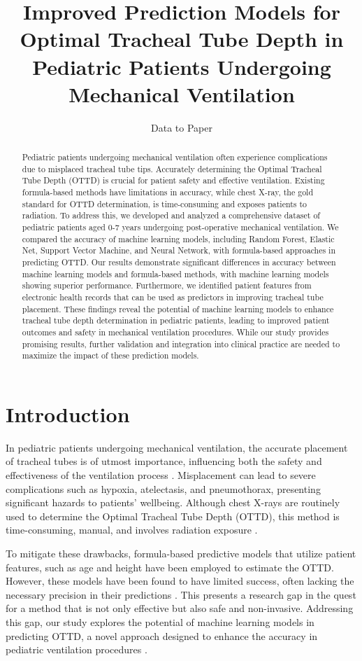 \documentclass[11pt]{article}
\title{Improved Prediction Models for Optimal Tracheal Tube Depth in Pediatric Patients Undergoing Mechanical Ventilation}
\author{Data to Paper}
\begin{document}
\maketitle
\begin{abstract}
Pediatric patients undergoing mechanical ventilation often experience complications due to misplaced tracheal tube tips. Accurately determining the Optimal Tracheal Tube Depth (OTTD) is crucial for patient safety and effective ventilation. Existing formula-based methods have limitations in accuracy, while chest X-ray, the gold standard for OTTD determination, is time-consuming and exposes patients to radiation. To address this, we developed and analyzed a comprehensive dataset of pediatric patients aged 0-7 years undergoing post-operative mechanical ventilation. We compared the accuracy of machine learning models, including Random Forest, Elastic Net, Support Vector Machine, and Neural Network, with formula-based approaches in predicting OTTD. Our results demonstrate significant differences in accuracy between machine learning models and formula-based methods, with machine learning models showing superior performance. Furthermore, we identified patient features from electronic health records that can be used as predictors in improving tracheal tube placement. These findings reveal the potential of machine learning models to enhance tracheal tube depth determination in pediatric patients, leading to improved patient outcomes and safety in mechanical ventilation procedures. While our study provides promising results, further validation and integration into clinical practice are needed to maximize the impact of these prediction models.
\end{abstract}
\section*{Introduction}

In pediatric patients undergoing mechanical ventilation, the accurate placement of tracheal tubes is of utmost importance, influencing both the safety and effectiveness of the ventilation process \cite{Kollef1994EndotrachealTM}. Misplacement can lead to severe complications such as hypoxia, atelectasis, and pneumothorax, presenting significant hazards to patients’ wellbeing. Although chest X-rays are routinely used to determine the Optimal Tracheal Tube Depth (OTTD), this method is time-consuming, manual, and involves radiation exposure \cite{Matava2020PediatricAM}.

To mitigate these drawbacks, formula-based predictive models that utilize patient features, such as age and height have been employed to estimate the OTTD. However, these models have been found to have limited success, often lacking the necessary precision in their predictions \cite{Cook2005ThePL}. This presents a research gap in the quest for a method that is not only effective but also safe and non-invasive. Addressing this gap, our study explores the potential of machine learning models in predicting OTTD, a novel approach designed to enhance the accuracy in pediatric ventilation procedures \cite{Palaniappan2014ACS}.
\end{document}
